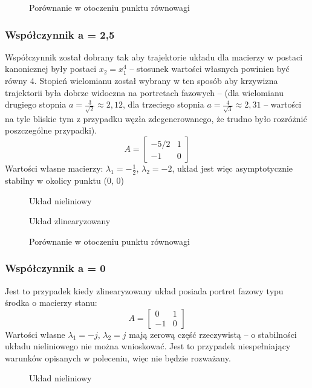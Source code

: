 \documentclass[a4paper, 10pt]{article}
\begin{document}
				\begin{figure}[H]
					\centering
					\def \svgwidth{0.8\columnwidth}
					
					\caption{Porównanie w otoczeniu punktu równowagi}
				\end{figure}\noindent
			\subsubsection{Współczynnik a = 2,5}
				Współczynnik został dobrany tak aby trajektorie układu dla macierzy w postaci kanonicznej były postaci $x_2 = x_1^4$ -- stosunek wartości własnych powinien być równy 4. Stopień wielomianu został wybrany w ten sposób aby krzywizna trajektorii była dobrze widoczna na portretach fazowych -- (dla wielomianu drugiego stopnia $a=\frac{3}{\sqrt{2}} \approx 2,12$, dla trzeciego stopnia $a=\frac{4}{\sqrt{3}} \approx 2,31$ -- wartości na tyle bliskie tym z przypadku węzła zdegenerowanego, że trudno było rozróżnić poszczególne przypadki).
				$$
					A = \begin{bmatrix}
						-5/2 & 1 \\
						-1 & 0
					\end{bmatrix}
				$$
				Wartości własne macierzy: $\lambda_1 = -\frac{1}{2}$, $\lambda_2 = -2$, układ jest więc asymptotycznie stabilny w okolicy punktu (0, 0)
				\begin{figure}[H]
					\centering
					\def \svgwidth{0.8\columnwidth}
					
					\caption{Układ nieliniowy}
				\end{figure}\noindent
				\begin{figure}[H]
					\centering
					\def \svgwidth{0.8\columnwidth}
					
					\caption{Układ zlinearyzowany}
				\end{figure}\noindent

				\begin{figure}[H]
					\centering
					\def \svgwidth{0.8\columnwidth}
					
					\caption{Porównanie w otoczeniu punktu równowagi}
				\end{figure}\noindent

			\subsubsection{Współczynnik a = 0}
				Jest to przypadek kiedy zlinearyzowany układ posiada portret fazowy typu środka o macierzy stanu:
				$$
				A = \begin{bmatrix}
				0 & 1 \\
				-1 & 0
				\end{bmatrix}
				$$
				Wartości własne $\lambda_1 = -j$, $\lambda_2 = j$ mają zerową część rzeczywistą -- o stabilności układu nieliniowego nie można wnioskować. Jest to przypadek niespełniający warunków opisanych w poleceniu, więc nie będzie rozważany.
				\begin{figure}[H]
					\centering
					\def \svgwidth{0.8\columnwidth}
					
					\caption{Układ nieliniowy}
				\end{figure}\noindent
\end{document}
